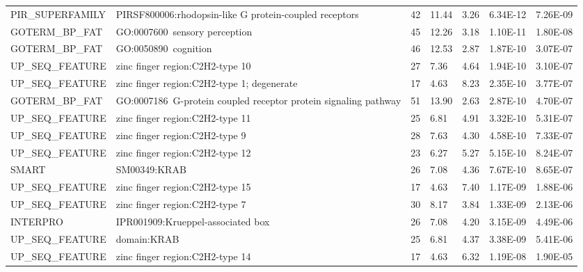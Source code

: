 \documentclass[a4paper,10pt,oneside]{book}
\begin{document}
{\begin{longtable}{lllllll}
PIR\_SUPERFAMILY  & PIRSF800006:rhodopsin-like G protein-coupled receptors          & 42    & 11.44 & 3.26            & 6.34E-12 & 7.26E-09 \\
GOTERM\_BP\_FAT   & GO:0007600~sensory perception                                   & 45    & 12.26 & 3.18            & 1.10E-11 & 1.80E-08 \\
GOTERM\_BP\_FAT   & GO:0050890~cognition                                            & 46    & 12.53 & 2.87            & 1.87E-10 & 3.07E-07 \\
UP\_SEQ\_FEATURE  & zinc finger region:C2H2-type 10                                 & 27    & 7.36  & 4.64            & 1.94E-10 & 3.10E-07 \\
UP\_SEQ\_FEATURE  & zinc finger region:C2H2-type 1; degenerate                      & 17    & 4.63  & 8.23            & 2.35E-10 & 3.77E-07 \\
GOTERM\_BP\_FAT   & GO:0007186~G-protein coupled receptor protein signaling pathway & 51    & 13.90 & 2.63            & 2.87E-10 & 4.70E-07 \\
UP\_SEQ\_FEATURE  & zinc finger region:C2H2-type 11                                 & 25    & 6.81  & 4.91            & 3.32E-10 & 5.31E-07 \\
UP\_SEQ\_FEATURE  & zinc finger region:C2H2-type 9                                  & 28    & 7.63  & 4.30            & 4.58E-10 & 7.33E-07 \\
UP\_SEQ\_FEATURE  & zinc finger region:C2H2-type 12                                 & 23    & 6.27  & 5.27            & 5.15E-10 & 8.24E-07 \\
SMART             & SM00349:KRAB                                                    & 26    & 7.08  & 4.36            & 7.67E-10 & 8.65E-07 \\
UP\_SEQ\_FEATURE  & zinc finger region:C2H2-type 15                                 & 17    & 4.63  & 7.40            & 1.17E-09 & 1.88E-06 \\
UP\_SEQ\_FEATURE  & zinc finger region:C2H2-type 7                                  & 30    & 8.17  & 3.84            & 1.33E-09 & 2.13E-06 \\
INTERPRO          & IPR001909:Krueppel-associated  box                              & 26    & 7.08  & 4.20            & 3.15E-09 & 4.49E-06 \\
UP\_SEQ\_FEATURE  & domain:KRAB                                                     & 25    & 6.81  & 4.37            & 3.38E-09 & 5.41E-06 \\
UP\_SEQ\_FEATURE  & zinc finger region:C2H2-type 14                                 & 17    & 4.63  & 6.32            & 1.19E-08 & 1.90E-05 \\

\end{longtable}}
\end{document}
